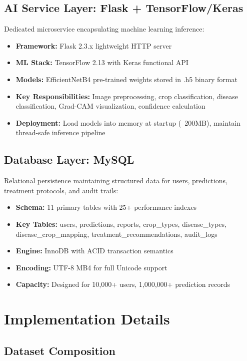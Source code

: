 \documentclass[conference]{IEEEtran}
\begin{document}
\subsection{AI Service Layer: Flask + TensorFlow/Keras}

Dedicated microservice encapsulating machine learning inference:

\begin{itemize}
\item \textbf{Framework:} Flask 2.3.x lightweight HTTP server
\item \textbf{ML Stack:} TensorFlow 2.13 with Keras functional API
\item \textbf{Models:} EfficientNetB4 pre-trained weights stored in .h5 binary format
\item \textbf{Key Responsibilities:} Image preprocessing, crop classification, disease classification, Grad-CAM visualization, confidence calculation
\item \textbf{Deployment:} Load models into memory at startup (~200MB), maintain thread-safe inference pipeline
\end{itemize}

\subsection{Database Layer: MySQL}

Relational persistence maintaining structured data for users, predictions, treatment protocols, and audit trails:

\begin{itemize}
\item \textbf{Schema:} 11 primary tables with 25+ performance indexes
\item \textbf{Key Tables:} users, predictions, reports, crop\_types, disease\_types, disease\_crop\_mapping, treatment\_recommendations, audit\_logs
\item \textbf{Engine:} InnoDB with ACID transaction semantics
\item \textbf{Encoding:} UTF-8 MB4 for full Unicode support
\item \textbf{Capacity:} Designed for 10,000+ users, 1,000,000+ prediction records
\end{itemize}

\section{Implementation Details}

\subsection{Dataset Composition}
\end{document}
